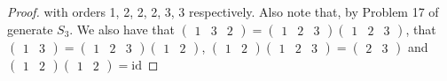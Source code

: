 \documentclass{article}
\begin{document}
\begin{proof}
with orders 1, 2, 2, 2, 3, 3 respectively. Also note that, by Problem 17 of generate $S_3$. We also have that $\left(\begin{array}{llll}1 & 3 & 2\end{array}\right)=\left(\begin{array}{llll}1 & 2 & 3\end{array}\right)\left(\begin{array}{lll}1 & 2 & 3\end{array}\right)$, that $\left(\begin{array}{lll}1 & 3\end{array}\right)=\left(\begin{array}{lll}1 & 2 & 3\end{array}\right)\left(\begin{array}{ll}1 & 2\end{array}\right)$, $\left(\begin{array}{ll}1 & 2\end{array}\right)\left(\begin{array}{lll}1 & 2 & 3\end{array}\right)=\left(\begin{array}{ll}2 & 3\end{array}\right)$ and $\left(\begin{array}{lll}1 & 2\end{array}\right)\left(\begin{array}{ll}1 & 2\end{array}\right)=\mathrm{id}$


\end{proof}
\end{document}
